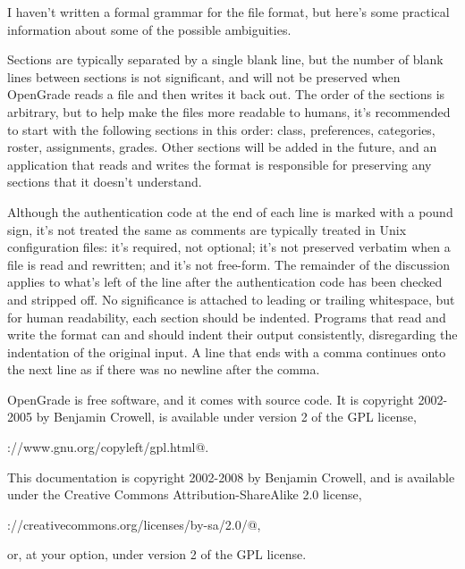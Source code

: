 \documentclass{opengrade_doc}
\begin{document}
I haven't written a formal grammar for the file format, but here's some
practical information about some of the possible ambiguities.

Sections
are typically separated by a single blank line, but the number of blank
lines between sections is not significant, and will not be
preserved when OpenGrade reads a file and then writes it back out.
The order of the sections is arbitrary, but to help
make the files more readable to humans, it's recommended to start with
the following sections in this order:
class, preferences, categories, roster, assignments, grades.
Other sections will be added in the future, and
an application that reads and writes the format is responsible for
preserving any sections that it doesn't understand.

Although the authentication code at the end of each line
is marked with a pound sign, it's
not treated the same as comments are typically treated in Unix
configuration files: it's required, not optional; it's not
preserved verbatim when a file is read and rewritten; and it's
not free-form.
The remainder of the discussion applies to what's left of the line after
the authentication code has been checked and stripped off.
No significance is attached to leading or trailing
whitespace, but for human readability, each section should be indented.
Programs that read and write the format can and should indent their
output consistently, disregarding the indentation of the original input.
A line that ends with a comma continues onto the next
line as if there was no newline after the comma.

\label{license}
OpenGrade is free software, and it comes with source code. It is
copyright 2002-2005 by Benjamin Crowell, is available under version
2 of the GPL license,

\verb@http://www.gnu.org/copyleft/gpl.html@.

This documentation is copyright 2002-2008 by
Benjamin Crowell, and is available under the Creative Commons
Attribution-ShareAlike 2.0 license, 

\verb@http://creativecommons.org/licenses/by-sa/2.0/@,

or, at your option, under version 2 of the GPL license.
\end{document}
